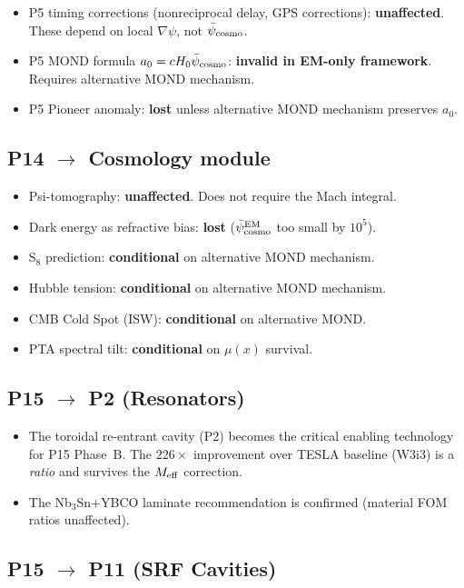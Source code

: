 \documentclass[11pt]{article}
\newcommand{\psicosmo}{\bar{\psi}_{\rm cosmo}}
\begin{document}
\begin{itemize}
\item P5 timing corrections (nonreciprocal delay, GPS corrections):
  \textbf{unaffected}. These depend on local $\nabla\psi$, not $\psicosmo$.
\item P5 MOND formula $a_0 = cH_0\psicosmo$: \textbf{invalid in EM-only
  framework}. Requires alternative MOND mechanism.
\item P5 Pioneer anomaly: \textbf{lost} unless alternative MOND mechanism
  preserves $a_0$.
\end{itemize}

\subsection{P14 $\to$ Cosmology module}

\begin{itemize}
\item Psi-tomography: \textbf{unaffected}. Does not require the Mach
  integral.
\item Dark energy as refractive bias: \textbf{lost} ($\psicosmo^{\rm EM}$
  too small by $10^5$).
\item S$_8$ prediction: \textbf{conditional} on alternative MOND mechanism.
\item Hubble tension: \textbf{conditional} on alternative MOND mechanism.
\item CMB Cold Spot (ISW): \textbf{conditional} on alternative MOND.
\item PTA spectral tilt: \textbf{conditional} on $\mu(x)$ survival.
\end{itemize}

\subsection{P15 $\to$ P2 (Resonators)}

\begin{itemize}
\item The toroidal re-entrant cavity (P2) becomes the critical enabling
  technology for P15 Phase~B. The $226\times$ improvement over TESLA
  baseline (W3i3) is a \emph{ratio} and survives the $M_{\rm eff}$
  correction.
\item The Nb$_3$Sn+YBCO laminate recommendation is confirmed (material
  FOM ratios unaffected).
\end{itemize}

\subsection{P15 $\to$ P11 (SRF Cavities)}
\end{document}
